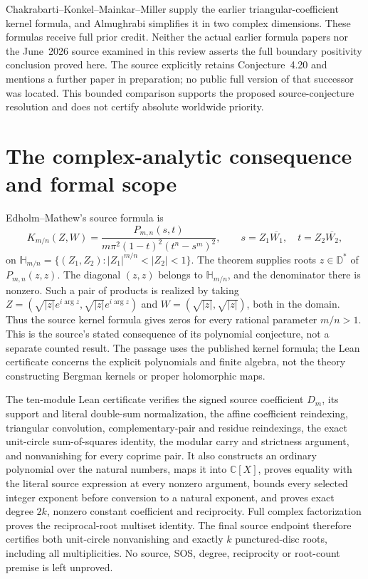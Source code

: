 \documentclass[11pt]{article}
\newcommand{\D}{\mathbb D}
\begin{document}
Chakrabarti--Konkel--Mainkar--Miller \cite{CKMM} supply the earlier
triangular-coefficient kernel formula, and Almughrabi \cite{Alm}
simplifies it in two complex dimensions. These formulas receive full
prior credit. Neither the actual earlier formula papers nor the
June~2026 source examined in this review asserts the full boundary
positivity conclusion proved here. The source explicitly retains
Conjecture~4.20 and mentions a further paper in preparation; no public
full version of that successor was located. This bounded comparison
supports the proposed source-conjecture resolution and does not certify
absolute worldwide priority.

\section{The complex-analytic consequence and formal scope}
Edholm--Mathew's source formula is
\[
 K_{m/n}(Z,W)=\frac{P_{m,n}(s,t)}{m\pi^2(1-t)^2(t^n-s^m)^2},
 \qquad s=Z_1\overline{W_1},\quad t=Z_2\overline{W_2},
\]
on $\mathbb H_{m/n}=\{(Z_1,Z_2):|Z_1|^{m/n}<|Z_2|<1\}$.
The theorem supplies roots $z\in\D^*$ of $P_{m,n}(z,z)$.
The diagonal $(z,z)$ belongs to $\mathbb H_{m/n}$, and the denominator
there is nonzero. Such a pair of products is realized by taking
$Z=(\sqrt{|z|}e^{i\arg z},\sqrt{|z|}e^{i\arg z})$ and
$W=(\sqrt{|z|},\sqrt{|z|})$, both in the domain.
Thus the source kernel formula gives zeros for every rational parameter
$m/n>1$. This is the source's stated consequence of its polynomial
conjecture, not a separate counted result. The passage uses the
published kernel formula; the Lean certificate concerns the explicit
polynomials and finite algebra, not the theory constructing Bergman
kernels or proper holomorphic maps.

The ten-module Lean certificate verifies the signed source coefficient
$D_m$, its support and literal double-sum normalization, the affine
coefficient reindexing, triangular convolution, complementary-pair and
residue reindexings, the exact unit-circle sum-of-squares identity, the
modular carry and strictness argument, and nonvanishing for every
coprime pair. It also constructs an ordinary polynomial over the
natural numbers, maps it into $\mathbb C[X]$, proves equality with the
literal source expression at every nonzero argument, bounds every
selected integer exponent before conversion to a natural exponent,
and proves exact degree $2k$, nonzero constant coefficient and
reciprocity. Full complex factorization proves the reciprocal-root
multiset identity. The final source endpoint therefore certifies both
unit-circle nonvanishing and exactly $k$ punctured-disc roots,
including all multiplicities. No source, SOS, degree, reciprocity or
root-count premise is left unproved.
\end{document}

